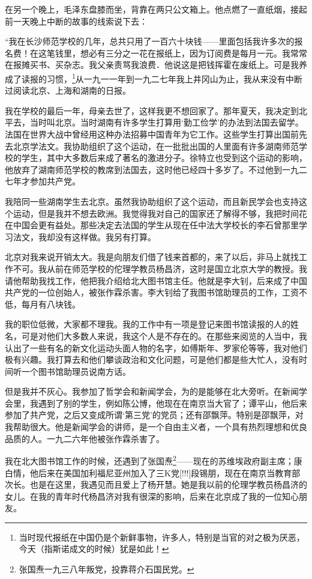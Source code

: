 \documentclass[10pt]{book}
\begin{document}
在另一个晚上，毛泽东盘膝而坐，背靠在两只公文箱上。他点燃了一直纸烟，接起前一天晚上中断的故事的线索说下去：

“我在长沙师范学校的几年，总共只用了一百六十块钱——里面包括我许多次的报名费！在这笔钱里，想必有三分之一花在报纸上，因为订阅费是每月一元。我常常在报摊买书、买杂志。我父亲责骂我浪费．他说这是把钱挥霍在废纸上。可是我养成了读报的习惯，\footnote{当时现代报纸在中国仍是个新鲜事物，许多人，特别是当官的对之极为厌恶，今天（指斯诺成文的时候）犹是如此！}从一九一一年到一九二七年我上井冈山为止，我从来没有中断过阅读北京、上海和湖南的日报。

我在学校的最后一年，母亲去世了，这样我更不想回家了。那年夏天，我决定到北平去，当时叫北京。当时湖南有许多学生打算用‘勤工俭学’的办法到法国去留学。法国在世界大战中曾经用这种办法招募中国青年为它工作。这些学生打算出国前先去北京学法文。我协助组织了这个运动，在一批批出国的人里面有许多湖南师范学校的学生，其中大多数后来成了著名的激进分子。徐特立也受到这个运动的影响，他放弃了湖南师范学校的教席到法国去，这时他已经四十多岁了。不过他到一九二七年才参加共产党。

我陪同一些湖南学生去北京。虽然我协助组织了这个运动，而且新民学会也支持这个运动，但是我并不想去欧洲。我觉得我对自己的国家还了解得不够，我把时间花在中国会更有益处。那些决定去法国的学生从现在任中法大学校长的李石曾那里学习法文，我却没有这样做。我另有打算。

北京对我来说开销太大。我是向朋友们借了钱来首都的，来了以后，非马上就找工作不可。我从前在师范学校的佗理学教员杨昌济，这时是国立北京大学的教授。我请他帮助我找工作，他把我介绍给北大图书馆主任。他就是李大钊，后来成了中国共产党的一位创始人，被张作霖杀害。李大钊给了我图书馆助理员的工作，工资不低，每月有八块钱。

我的职位低微，大家都不理我。我的工作中有一项是登记来图书馆读报的人的姓名，可是对他们大多数人来说，我这个人是不存在的。在那些来阅览的人当中，我认出了一些有名的新文化运动头面人物的名字，如傅斯年、罗家伦等等，我对他们极有兴趣。我打算去和他们攀谈政治和文化问题，可是他们都是些大忙人，没有时间听一个图书馆助理员说南方话。

但是我并不灰心。我参加了哲学会和新闻学会，为的是能够在北大旁听。在新闻学会里，我遇到了别的学生，例如陈公博，他现在在南京当大官了；谭平山，他后来参加了共产党，之后又变成所谓‘第三党’的党员；还有邵飘萍。特别是邵飘萍，对我帮助很大。他是新闻学会的讲师，是一个自由主义者，一个具有热烈理想和优良品质的人。一九二六年他被张作霖杀害了。

我在北大图书馆工作的时候，还遇到了张国焘\footnote{张国焘一九三八年叛党，投靠蒋介石国民党。}——现在的苏维埃政府副主席；康白情，他后来在美国加利福尼亚州加入了三K党[!!!]段锡朋，现在在南京当教育部次长。也是在这里，我遇见而且爱上了杨开慧。她是我以前的伦理学教员杨昌济的女儿。在我的青年时代杨昌济对我有很深的影响，后来在北京成了我的一位知心朋友。
\end{document}
